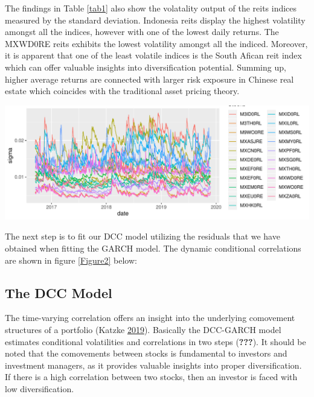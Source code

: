 \documentclass[11pt,preprint, authoryear]{elsarticle}
\let\origfigure\figure
\let\endorigfigure\endfigure
\renewenvironment{figure}[1][2] {
    \expandafter\origfigure\expandafter[H]
} {
    \endorigfigure
}
\numberwithin{equation}{section}
\numberwithin{figure}{section}
\numberwithin{table}{section}
\begin{document}
The findings in Table \ref{tab1} also show the volatality output of the
reits indices measured by the standard deviation. Indonesia reits
display the highest volatility amongst all the indices, however with one
of the lowest daily returns. The MXWD0RE reits exhibits the lowest
volatility amongst all the indiced. Moreover, it is apparent that one of
the least volatile indices is the South Afican reit index which can
offer valuable insights into diversification potential. Summing up,
higher average returns are connected with larger risk exposure in
Chinese real estate which coincides with the traditional asset pricing
theory.

\begin{figure}[H]

{\centering \includegraphics{Template_files/figure-latex/vol.datplotReits-1} 

}

\caption{Volatility of each asset \label{Figure1}}\label{fig:vol.datplotReits}
\end{figure}

The next step is to fit our DCC model utilizing the residuals that we
have obtained when fitting the GARCH model. The dynamic conditional
correlations are shown in figure \ref{Figure2} below:

\hypertarget{the-dcc-model}{%
\subsection{\texorpdfstring{The DCC Model
\label{The DCC Model}}{The DCC Model }}\label{the-dcc-model}}

The time-varying correlation offers an insight into the underlying
comovement structures of a portfolio (Katzke
\protect\hyperlink{ref-katzke2019multivariate}{2019}). Basically the
DCC-GARCH model estimates conditional volatilities and correlations in
two steps ({\textbf{???}}). It should be noted that the comovements
between stocks is fundamental to investors and investment managers, as
it provides valuable insights into proper diversification. If there is a
high correlation between two stocks, then an investor is faced with low
diversification.
\end{document}

